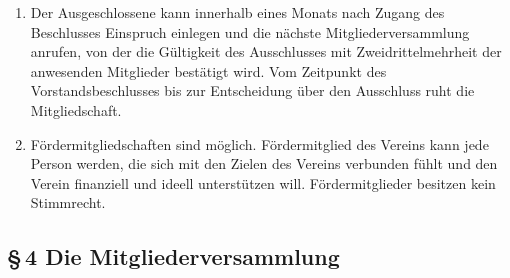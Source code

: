 \documentclass[12pt,a4paper]{article}
\begin{document}
\begin{enumerate}
\item Der Ausgeschlossene kann innerhalb eines Monats nach Zugang des Beschlusses Einspruch einlegen und die nächste Mitgliederversammlung anrufen, von der die Gültigkeit des Ausschlusses mit Zweidrittelmehrheit der anwesenden Mitglieder bestätigt wird. Vom Zeitpunkt des Vorstandsbeschlusses bis zur Entscheidung über den Ausschluss ruht die Mitgliedschaft.
\item Fördermitgliedschaften sind möglich. Fördermitglied des Vereins kann jede Person werden, die sich mit den Zielen des Vereins verbunden fühlt und den Verein finanziell und ideell unterstützen will. Fördermitglieder besitzen kein Stimmrecht.
\end{enumerate}

\subsection*{§\,4 Die Mitgliederversammlung}
\end{document}
